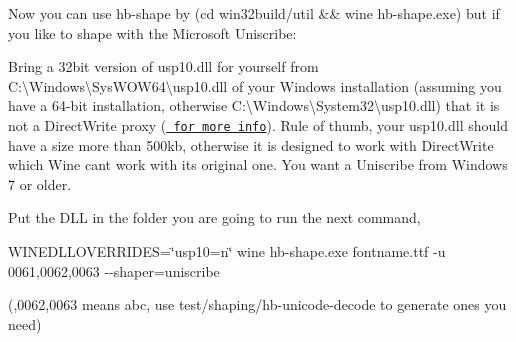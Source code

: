 Now you can use {\ttfamily hb-\/shape} by {\ttfamily (cd win32build/util \&\& wine hb-\/shape.\+exe)} but if you like to shape with the Microsoft Uniscribe\+:


\begin{DoxyEnumerate}
\item Bring a 32bit version of {\ttfamily usp10.\+dll} for yourself from {\ttfamily C\+:\textbackslash{}Windows\textbackslash{}Sys\+WOW64\textbackslash{}usp10.\+dll} of your Windows installation (assuming you have a 64-\/bit installation, otherwise {\ttfamily C\+:\textbackslash{}Windows\textbackslash{}System32\textbackslash{}usp10.\+dll}) that it is not a Direct\+Write proxy (\href{https://en.wikipedia.org/wiki/Uniscribe}{\texttt{ for more info}}). Rule of thumb, your {\ttfamily usp10.\+dll} should have a size more than 500kb, otherwise it is designed to work with Direct\+Write which Wine can\textquotesingle{}t work with its original one. You want a Uniscribe from Windows 7 or older.

Put the DLL in the folder you are going to run the next command,
\item {\ttfamily WINEDLLOVERRIDES=\char`\"{}usp10=n\char`\"{} wine hb-\/shape.\+exe fontname.\+ttf -\/u 0061,0062,0063 -\/-\/shaper=uniscribe}
\end{DoxyEnumerate}

({,0062,0063} means {\ttfamily abc}, use test/shaping/hb-\/unicode-\/decode to generate ones you need) 